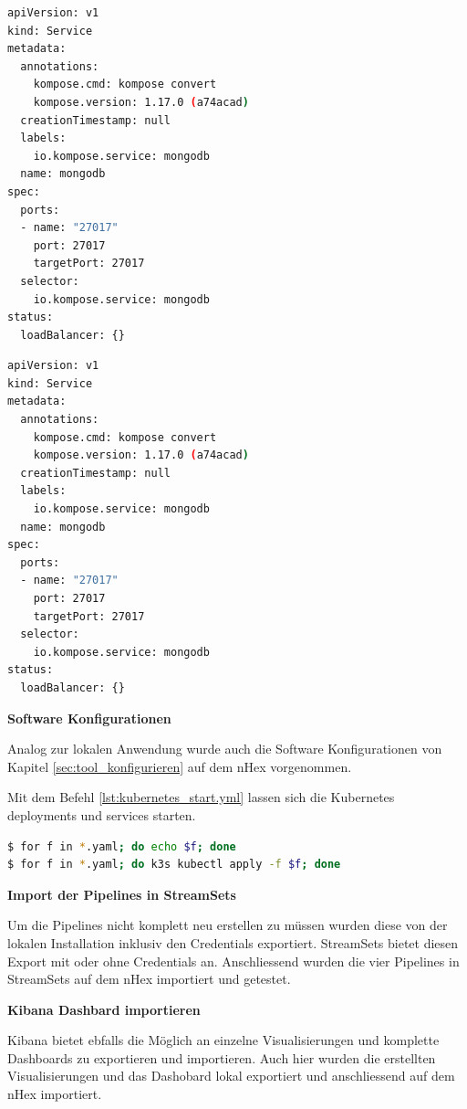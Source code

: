 \begin{lstlisting}[float=h,language=bash,frame=tb,caption={Kubernetes mongodb-service.yaml},label=lst:kubernetes_service.yml]
apiVersion: v1
kind: Service
metadata:
  annotations:
    kompose.cmd: kompose convert
    kompose.version: 1.17.0 (a74acad)
  creationTimestamp: null
  labels:
    io.kompose.service: mongodb
  name: mongodb
spec:
  ports:
  - name: "27017"
    port: 27017
    targetPort: 27017
  selector:
    io.kompose.service: mongodb
status:
  loadBalancer: {}
\end{lstlisting} 

\begin{lstlisting}[float=h,language=bash,frame=tb,caption={Kubernetes mongodb-persistentvolumeclaim.yaml},label=lst:kubernetes_persistentvolumeclaim.yml]
apiVersion: v1
kind: Service
metadata:
  annotations:
    kompose.cmd: kompose convert
    kompose.version: 1.17.0 (a74acad)
  creationTimestamp: null
  labels:
    io.kompose.service: mongodb
  name: mongodb
spec:
  ports:
  - name: "27017"
    port: 27017
    targetPort: 27017
  selector:
    io.kompose.service: mongodb
status:
  loadBalancer: {}
\end{lstlisting}

\textbf{Software Konfigurationen}

Analog zur lokalen Anwendung wurde auch die Software Konfigurationen von Kapitel \ref{sec:tool_konfigurieren} auf dem nHex vorgenommen.

Mit dem Befehl \ref{lst:kubernetes_start.yml} lassen sich die Kubernetes deployments und services starten. 

\begin{lstlisting}[float=h,language=bash,frame=tb,caption={Kubernetes start deployments und services},label=lst:kubernetes_start.yml]
$ for f in *.yaml; do echo $f; done
$ for f in *.yaml; do k3s kubectl apply -f $f; done
\end{lstlisting}

\textbf{Import der Pipelines in StreamSets}

Um die Pipelines nicht komplett neu erstellen zu m{\"u}ssen wurden diese von der lokalen Installation inklusiv den Credentials exportiert. StreamSets bietet diesen Export mit oder ohne Credentials an. Anschliessend wurden die vier Pipelines in StreamSets auf dem nHex importiert und getestet. 

\textbf{Kibana Dashbard importieren}

Kibana bietet ebfalls die M{\"o}glich an einzelne Visualisierungen und komplette Dashboards zu exportieren und importieren. Auch hier wurden die erstellten Visualisierungen und das Dashobard lokal exportiert und anschliessend auf dem nHex importiert.






